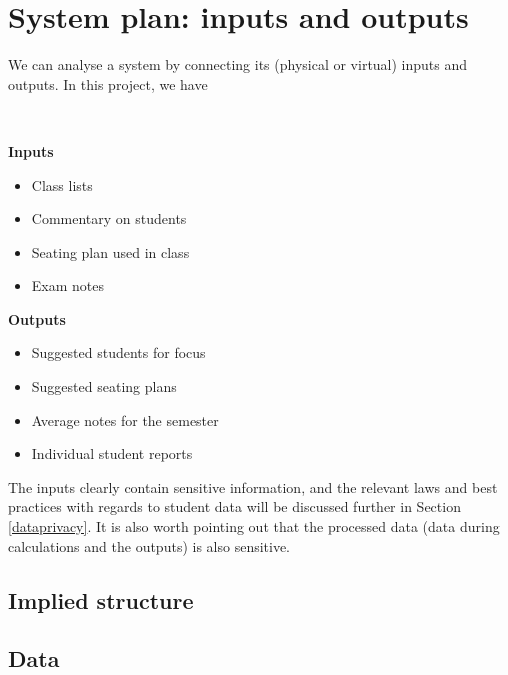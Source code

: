 \documentclass[10pt]{article}
\begin{document}
\section{System plan: inputs and outputs} \label{inout}

We can analyse a system by connecting its (physical or virtual) inputs and outputs. In this project, we have

\

\begin{minipage}[t]{0.38\textwidth}

\textbf{Inputs}

\begin{itemize}
\item Class lists
\item Commentary on students
\item Seating plan used in class
\item Exam notes
\end{itemize}


\end{minipage}
\hfill
\vline
\hfill
\begin{minipage}[t]{0.48\textwidth}

\textbf{Outputs}

\begin{itemize}
\item Suggested students for focus
\item Suggested seating plans
\item Average notes for the semester
\item Individual student reports
\end{itemize}

\end{minipage}

\vspace{5mm}

The inputs clearly contain sensitive information, and the relevant laws and best practices with regards to student data will be discussed further in Section \ref{dataprivacy}. It is also worth pointing out that the processed data (data during calculations and the outputs) is also sensitive.

\subsection{Implied structure}

\subsection{Data}
\end{document}
